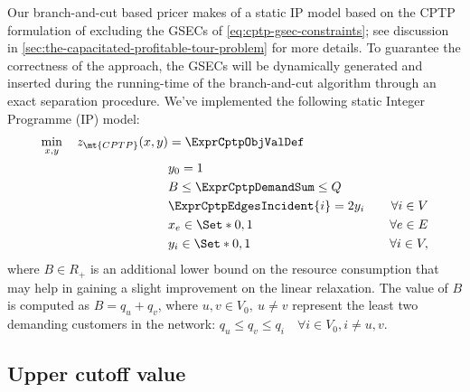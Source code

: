 Our branch-and-cut based pricer makes of a static IP model
based on the CPTP formulation of 
excluding the GSECs of \cref{eq:cptp-gsec-constraints};
see discussion in \cref{sec:the-capacitated-profitable-tour-problem} for more details.
To guarantee the correctness of the approach,
the GSECs will be dynamically generated and inserted
during the running-time of the branch-and-cut algorithm
through an exact separation procedure.
We've implemented the following static Integer Programme (IP) model:
\begin{align}
	\min_{x,y} \quad z_\mt{CPTP}(x, y) & = \ExprCptpObjValDef                                              \\
	                                   & y_0 = 1                                  &                        \\
	                                   & B \le   \ExprCptpDemandSum   \le Q       &                        \\
	                                   & \ExprCptpEdgesIncident{i}    = 2 y_i     & \quad \forall i \in V  \\
	                                   & x_{e}                   \in \Set*{0, 1}  & \quad \forall e \in E  \\
	                                   & y_{i}                    \in \Set*{0, 1} & \quad \forall i \in V,
\end{align}
where
$B \in R_+$ is an additional lower bound on the resource consumption
that may help in gaining a slight improvement on the linear relaxation.
The value of $B$ is computed as $B = q_u + q_v$, where $u, v \in V_0,\ u \ne v$
represent the least two demanding customers in the network:
$q_u \le q_v \le q_i \quad \forall i \in V_0, i \ne u, v$.

\subsection{Upper cutoff value}
\label{sec:impl-upper-cutoff-value}

